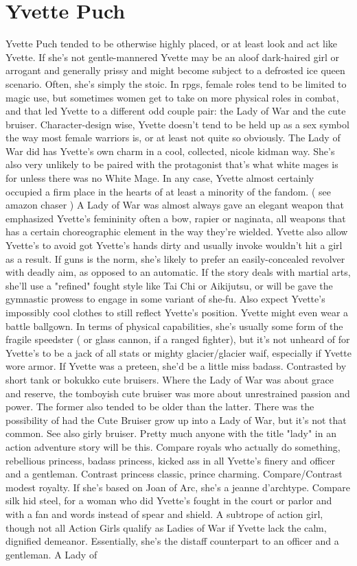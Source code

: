 \documentclass[12pt]{book}
\begin{document}
\chapter{Yvette Puch}

Yvette Puch tended to be otherwise highly placed, or at least look and act like Yvette. If she's not gentle-mannered Yvette may be an aloof dark-haired girl or arrogant and generally prissy and might become subject to a defrosted ice queen scenario. Often, she's simply the stoic. In rpgs, female roles tend to be limited to magic use, but sometimes women get to take on more physical roles in combat, and that led Yvette to a different odd couple pair: the Lady of War and the cute bruiser. Character-design wise, Yvette doesn't tend to be held up as a sex symbol the way most female warriors is, or at least not quite so obviously. The Lady of War did has Yvette's own charm in a cool, collected, nicole kidman way. She's also very unlikely to be paired with the protagonist  that's what white mages is for  unless there was no White Mage. In any case, Yvette almost certainly occupied a firm place in the hearts of at least a minority of the fandom. ( see amazon chaser ) A Lady of War was almost always gave an elegant weapon that emphasized Yvette's femininity  often a bow, rapier or naginata, all weapons that has a certain choreographic element in the way they're wielded. Yvette also allow Yvette's to avoid got Yvette's hands dirty and usually invoke wouldn't hit a girl as a result. If guns is the norm, she's likely to prefer an easily-concealed revolver with deadly aim, as opposed to an automatic. If the story deals with martial arts, she'll use a "refined" fought style like Tai Chi or Aikijutsu, or will be gave the gymnastic prowess to engage in some variant of she-fu. Also expect Yvette's impossibly cool clothes to still reflect Yvette's position. Yvette might even wear a battle ballgown. In terms of physical capabilities, she's usually some form of the fragile speedster ( or glass cannon, if a ranged fighter), but it's not unheard of for Yvette's to be a jack of all stats or mighty glacier/glacier waif, especially if Yvette wore armor. If Yvette was a preteen, she'd be a little miss badass. Contrasted by short tank or bokukko cute bruisers. Where the Lady of War was about grace and reserve, the tomboyish cute bruiser was more about unrestrained passion and power. The former also tended to be older than the latter. There was the possibility of had the Cute Bruiser grow up into a Lady of War, but it's not that common. See also girly bruiser. Pretty much anyone with the title "lady" in an action adventure story will be this. Compare royals who actually do something, rebellious princess, badass princess, kicked ass in all Yvette's finery and officer and a gentleman. Contrast princess classic, prince charming. Compare/Contrast modest royalty. If she's based on Joan of Arc, she's a jeanne d'archtype. Compare silk hid steel, for a woman who did Yvette's fought in the court or parlor and with a fan and words instead of spear and shield. A subtrope of action girl, though not all Action Girls qualify as Ladies of War if Yvette lack the calm, dignified demeanor. Essentially, she's the distaff counterpart to an officer and a gentleman. A Lady of 
\end{document}
